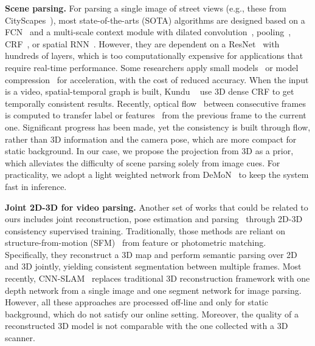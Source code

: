 \textbf{Scene parsing.} For parsing a single image of street views (e.g., these from CityScapes~\cite{Cordts2016Cityscapes}), most state-of-the-arts (SOTA) algorithms are designed based on a FCN~\cite{WuSH16e} and a multi-scale context module with dilated convolution~\cite{ChenPSA17}, pooling~\cite{ZhaoSQWJ16}, CRF~\cite{higherordercrf_ECCV2016}, or spatial RNN~\cite{byeon2015scene}. However, they are dependent on a ResNet~\cite{HeZRS15} with hundreds of layers, which is too computationally expensive for applications that require real-time performance. 
Some researchers apply small models~\cite{PaszkeCKC16} or model compression~\cite{ZhaoQSSJ17} for acceleration, with the cost of reduced accuracy.
When the input is a video, spatial-temporal graph is built, Kundu \etal~\cite{kundu2016feature} use 3D dense CRF to get temporally consistent results. Recently, optical flow~\cite{dosovitskiy2015flownet} between consecutive frames is computed to transfer label or features~\cite{gadde2017semantic,zhu2016deep} from the previous frame to the current one.  Significant progress has been made, yet the consistency is built through flow, rather than 3D information and the camera pose, which are more compact for static background. In our case, we propose the projection from 3D as a prior, which alleviates the difficulty of scene parsing solely from image cues. For practicality, we adopt a light weighted network from DeMoN~\cite{ummenhofer2016demon} to keep the system fast in inference.%

\textbf{Joint 2D-3D for video parsing.} Another set of works that could be related to ours includes joint reconstruction, pose estimation and parsing~\cite{kundu2014joint,hane2013joint} through 2D-3D consistency supervised training.
 Traditionally, those methods are reliant on structure-from-motion (SFM)~\cite{hane2013joint} from feature or photometric matching. Specifically, they reconstruct a 3D map and perform semantic parsing over 2D and 3D jointly, yielding consistent segmentation between multiple frames.
 Most recently, CNN-SLAM~\cite{tateno2017cnn} replaces traditional 3D reconstruction framework with one depth network from a single image and one segment network for image parsing.
 However, all these approaches are processed off-line and only for static background, which do not satisfy our online setting. Moreover, the quality of a reconstructed 3D model is not comparable with the one collected with a 3D scanner. %
